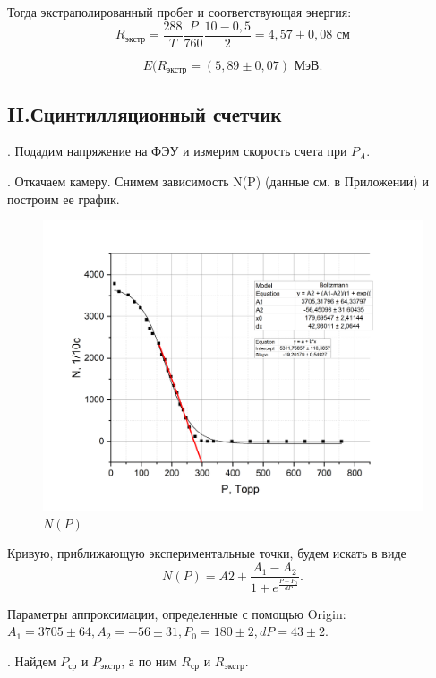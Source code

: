 \documentclass[a4paper,12pt]{article} %
\begin{document}
\noindent Тогда экстраполированный пробег и соответствующая энергия:
$$R_{\text{экстр}} = \frac{288}{T} \frac{P}{760} \frac{10 - 0,5}{2} = 4,57 \pm 0,08 \text{ см}$$

$$E(R_{\text{экстр}} = (5,89 \pm 0,07) \text{ МэВ}.$$

\subsection{II.Сцинтилляционный счетчик}

. Подадим напряжение на ФЭУ и измерим скорость счета при $P_A$.

\medskip

. Откачаем камеру. Снимем зависимость N(P) (данные см. в Приложении) и построим ее график.

\begin{figure}[h!]
    \centering
    \includegraphics[scale=0.5]{2.png}
    \caption{$N(P)$}
    
\end{figure}

\noindent Кривую, приближающую экспериментальные точки, будем искать в виде
$$N(P) = A2 + \frac{A_1 - A_2}{1 + e^{\frac{P-P_0}{dP}}}.$$

\medskip

\noindent Параметры аппроксимации, определенные с помощью Origin: $A_1 = 3705 \pm 64, A_2 = -56 \pm 31, P_0 = 180 \pm 2, dP = 43 \pm 2.$

\medskip

. Найдем $P_{\text{ср}}$ и $P_{\text{экстр}}$, а по ним $R_{\text{ср}}$ и $R_{\text{экстр}}$.
\end{document}
